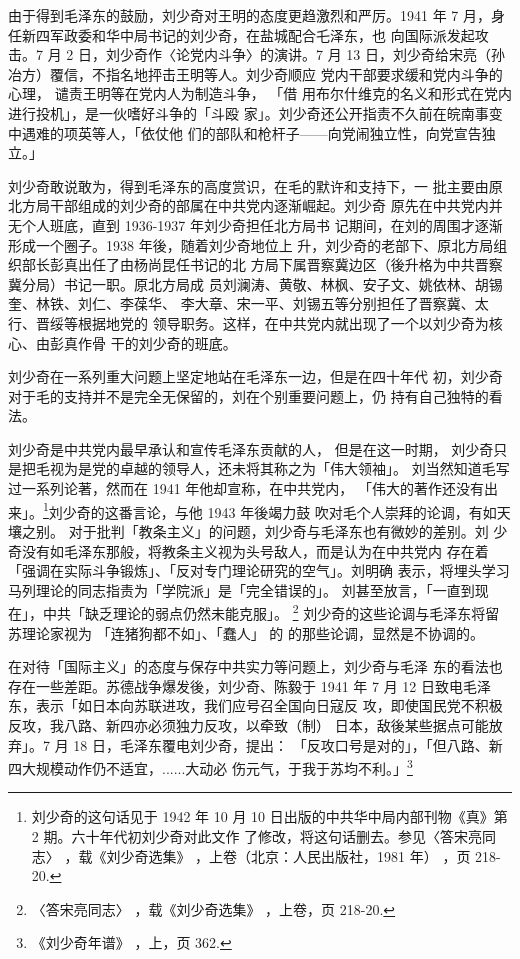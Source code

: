 由于得到毛泽东的鼓励，刘少奇对王明的态度更趋激烈和严厉。1941
年 7 月，身任新四军政委和华中局书记的刘少奇，在盐城配合乇泽东，也
向国际派发起攻击。7 月 2 日，刘少奇作〈论党内斗争〉的演讲。7 月 13
日，刘少奇给宋亮（孙冶方）覆信，不指名地抨击王明等人。刘少奇顺应
党内干部要求缓和党内斗争的心理，
谴责王明等在党内人为制造斗争，
「借
用布尔什维克的名义和形式在党内进行投机」，是一伙嗜好斗争的「斗殴
家」。刘少奇还公开指责不久前在皖南事变中遇难的项英等人，「依仗他
们的部队和枪杆子——向党闹独立性，向党宣告独立。」

刘少奇敢说敢为，得到毛泽东的高度赏识，在毛的默许和支持下，一
批主要由原北方局干部组成的刘少奇的部属在中共党内逐渐崛起。刘少奇
原先在中共党内并无个人班底，直到 1936-1937 年刘少奇担任北方局书
记期间，在刘的周围才逐渐形成一个圈子。1938 年後，随着刘少奇地位上
升，刘少奇的老部下、原北方局组织部长彭真出任了由杨尚昆任书记的北
方局下属晋察冀边区（後升格为中共晋察冀分局）书记一职。原北方局成
员刘澜涛、黄敬、林枫、安子文、姚依林、胡锡奎、林铁、刘仁、李葆华、
李大章、宋一平、刘锡五等分别担任了晋察冀、太行、晋绥等根据地党的
领导职务。这样，在中共党内就出现了一个以刘少奇为核心、由彭真作骨
干的刘少奇的班底。

刘少奇在一系列重大问题上坚定地站在毛泽东一边，但是在四十年代
初，刘少奇对于毛的支持并不是完全无保留的，刘在个别重要问题上，仍
持有自己独特的看法。

刘少奇是中共党内最早承认和宣传毛泽东贡献的人，
但是在这一时期，
刘少奇只是把毛视为是党的卓越的领导人，还未将其称之为「伟大领袖」。
刘当然知道毛写过一系列论著，然而在 1941 年他却宣称，在中共党内，
「伟大的著作还没有出来」。\footnote{刘少奇的这句话见于 1942 年 10 月 10 日出版的中共华中局内部刊物《真》第 2 期。六十年代初刘少奇对此文作
了修改，将这句话删去。参见〈答宋亮同志〉
，载《刘少奇选集》
，上卷（北京：人民出版社，1981 年）
，页 218-20. 
}刘少奇的这番言论，与他 1943 年後竭力鼓
吹对毛个人崇拜的论调，有如天壤之别。
对于批判「教条主义」的问题，刘少奇与毛泽东也有微妙的差别。刘
少奇没有如毛泽东那般，将教条主义视为头号敌人，而是认为在中共党内
存在着「强调在实际斗争锻炼」、「反对专门理论研究的空气」。刘明确
表示，将埋头学习马列理论的同志指责为「学院派」是「完全错误的」。
刘甚至放言，「一直到现在」，中共「缺乏理论的弱点仍然未能克服」。
\footnote{〈答宋亮同志〉
，载《刘少奇选集》
，上卷，页 218-20. 
}
刘少奇的这些论调与毛泽东将留苏理论家视为
「连猪狗都不如」、「蠢人」
的
的那些论调，显然是不协调的。

在对待「国际主义」的态度与保存中共实力等问题上，刘少奇与毛泽
东的看法也存在一些差距。苏德战争爆发後，刘少奇、陈毅于 1941 年 7
月 12 日致电毛泽东，表示「如日本向苏联进攻，我们应号召全国向日寇反
攻，即使国民党不积极反攻，我八路、新四亦必须独力反攻，以牵致（制）
日本，敌後某些据点可能放弃」。7 月 18 日，毛泽东覆电刘少奇，提出：
「反攻口号是对的」，「但八路、新四大规模动作仍不适宜，......大动必
伤元气，于我于苏均不利。」\footnote{《刘少奇年谱》
，上，页 362. 
}


